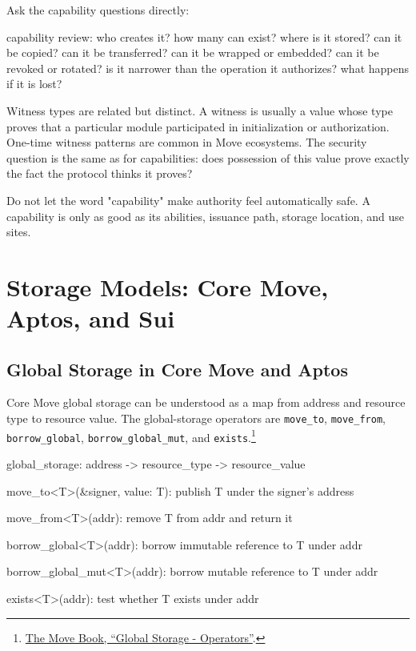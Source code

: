Ask the capability questions directly:

\begin{codeblock}
capability review:
    who creates it?
    how many can exist?
    where is it stored?
    can it be copied?
    can it be transferred?
    can it be wrapped or embedded?
    can it be revoked or rotated?
    is it narrower than the operation it authorizes?
    what happens if it is lost?
\end{codeblock}

Witness types are related but distinct. A witness is usually a value whose type proves that a particular module participated in initialization or authorization. One-time witness patterns are common in Move ecosystems. The security question is the same as for capabilities: does possession of this value prove exactly the fact the protocol thinks it proves?

Do not let the word "capability" make authority feel automatically safe. A capability is only as good as its abilities, issuance path, storage location, and use sites.

\section{Storage Models: Core Move, Aptos, and Sui}

\subsection{Global Storage in Core Move and Aptos}

Core Move global storage can be understood as a map from address and resource type to resource value. The global-storage operators are \texttt{move\_to}, \texttt{move\_from}, \texttt{borrow\_global}, \texttt{borrow\_global\_mut}, and \texttt{exists}.\footnote{\href{https://move-language.github.io/move/global-storage-operators.html}{The Move Book, ``Global Storage - Operators''}.}

\begin{codeblock}
global_storage:
    address -> resource_type -> resource_value

move_to<T>(&signer, value: T):
    publish T under the signer's address

move_from<T>(addr):
    remove T from addr and return it

borrow_global<T>(addr):
    borrow immutable reference to T under addr

borrow_global_mut<T>(addr):
    borrow mutable reference to T under addr

exists<T>(addr):
    test whether T exists under addr
\end{codeblock}

